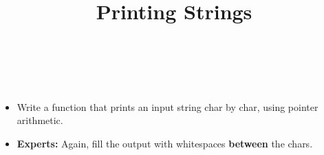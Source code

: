 

\title{Printing Strings} %
\author{} %
\renewcommand{\difficulty}{Hard} %
\renewcommand{\requirements}{Pointer Arithmetic} %
\renewcommand{\aims}{Iterating through an array by pointer arithmetic} %


 \maketitle
 \taskinfos

\ \\\ \\

\begin{itemize}
	\item Write a function that prints an input string char by char, using pointer arithmetic.
	\item \textbf{Experts:} Again, fill the output with whitespaces \textbf{between} the chars.
\end{itemize}	
 
 

